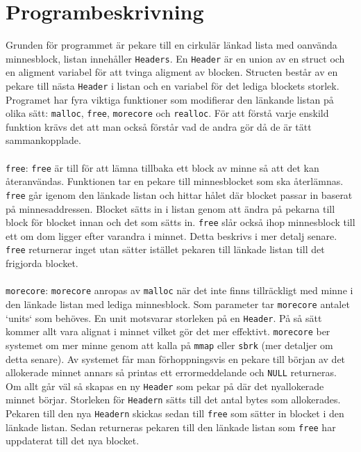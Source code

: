 \documentclass[a4paper]{article}
\begin{document}
\section*{Programbeskrivning}
Grunden för programmet är pekare till en cirkulär länkad lista med oanvända minnesblock, listan innehåller \texttt{Headers}. En \texttt{Header} är en union av en struct och en aligment variabel för att tvinga aligment av blocken. Structen består av en pekare till nästa \texttt{Header} i listan och en variabel för det lediga blockets storlek.
\\
Programet har fyra viktiga funktioner som modifierar den länkande listan på olika sätt: \texttt{malloc}, \texttt{free}, \texttt{morecore} och \texttt{realloc}. För att förstå varje enskild funktion krävs det att man också förstår vad de andra gör då de är tätt sammankopplade. 
\\\\
\texttt{free}: \texttt{free} är till för att lämna tillbaka ett block av minne så att det kan återanvändas. Funktionen tar en pekare till minnesblocket som ska återlämnas. \texttt{free} går igenom den länkade listan och hittar hålet där blocket passar in baserat på minnesaddressen. Blocket sätts in i listan genom att ändra på pekarna till block för blocket innan och det som sätts in. \texttt{free} slår också ihop minnesblock till ett om dom ligger efter varandra i minnet. Detta beskrivs i mer detalj senare. \texttt{free} returnerar inget utan sätter istället pekaren till länkade listan till det frigjorda blocket.
\\\\
\texttt{morecore}: \texttt{morecore} anropas av \texttt{malloc} när det inte finns tillräckligt med minne i den länkade listan med lediga minnesblock. Som parameter tar \texttt{morecore} antalet `units` som behöves. En unit motsvarar storleken på en \texttt{Header}. På så sätt kommer allt vara alignat i minnet vilket gör det mer effektivt. \texttt{morecore} ber systemet om mer minne genom att kalla på \texttt{mmap} eller \texttt{sbrk} (mer detaljer om detta senare). Av systemet får man förhoppningsvis en pekare till början av det allokerade minnet annars så printas ett errormeddelande och \texttt{NULL} returneras. Om allt går väl så skapas en ny \texttt{Header} som pekar på där det nyallokerade minnet börjar. Storleken för \texttt{Headern} sätts till det antal bytes som allokerades. Pekaren till den nya \texttt{Headern} skickas sedan till \texttt{free} som sätter in blocket i den länkade listan. Sedan returneras pekaren till den länkade listan som \texttt{free} har uppdaterat till det nya blocket.
\end{document}
